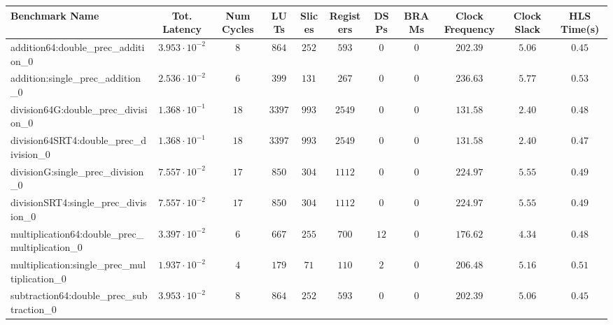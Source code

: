 \begin{tabular}{|l|c|c|c|c|c|c|c|c|c|c|}
\hline
Benchmark Name                                   & Tot. Latency            & Num Cycles & LUTs      & Slices   & Registers & DSPs   & BRAMs & Clock Frequency & Clock Slack & HLS Time(s) \\
\hline
addition64:double\_prec\_addition\_0             & $ 3.953 \cdot 10^{-2} $ & $ 8      $ & $ 864   $ & $ 252  $ & $ 593   $ & $ 0  $ & $ 0 $ & $ 202.39      $ & $ 5.06    $ & $ 0.45    $ \\
addition:single\_prec\_addition\_0               & $ 2.536 \cdot 10^{-2} $ & $ 6      $ & $ 399   $ & $ 131  $ & $ 267   $ & $ 0  $ & $ 0 $ & $ 236.63      $ & $ 5.77    $ & $ 0.53    $ \\
division64G:double\_prec\_division\_0            & $ 1.368 \cdot 10^{-1} $ & $ 18     $ & $ 3397  $ & $ 993  $ & $ 2549  $ & $ 0  $ & $ 0 $ & $ 131.58      $ & $ 2.40    $ & $ 0.48    $ \\
division64SRT4:double\_prec\_division\_0         & $ 1.368 \cdot 10^{-1} $ & $ 18     $ & $ 3397  $ & $ 993  $ & $ 2549  $ & $ 0  $ & $ 0 $ & $ 131.58      $ & $ 2.40    $ & $ 0.47    $ \\
divisionG:single\_prec\_division\_0              & $ 7.557 \cdot 10^{-2} $ & $ 17     $ & $ 850   $ & $ 304  $ & $ 1112  $ & $ 0  $ & $ 0 $ & $ 224.97      $ & $ 5.55    $ & $ 0.49    $ \\
divisionSRT4:single\_prec\_division\_0           & $ 7.557 \cdot 10^{-2} $ & $ 17     $ & $ 850   $ & $ 304  $ & $ 1112  $ & $ 0  $ & $ 0 $ & $ 224.97      $ & $ 5.55    $ & $ 0.49    $ \\
multiplication64:double\_prec\_multiplication\_0 & $ 3.397 \cdot 10^{-2} $ & $ 6      $ & $ 667   $ & $ 255  $ & $ 700   $ & $ 12 $ & $ 0 $ & $ 176.62      $ & $ 4.34    $ & $ 0.48    $ \\
multiplication:single\_prec\_multiplication\_0   & $ 1.937 \cdot 10^{-2} $ & $ 4      $ & $ 179   $ & $ 71   $ & $ 110   $ & $ 2  $ & $ 0 $ & $ 206.48      $ & $ 5.16    $ & $ 0.51    $ \\
subtraction64:double\_prec\_subtraction\_0       & $ 3.953 \cdot 10^{-2} $ & $ 8      $ & $ 864   $ & $ 252  $ & $ 593   $ & $ 0  $ & $ 0 $ & $ 202.39      $ & $ 5.06    $ & $ 0.45    $ \\

\end{tabular}
